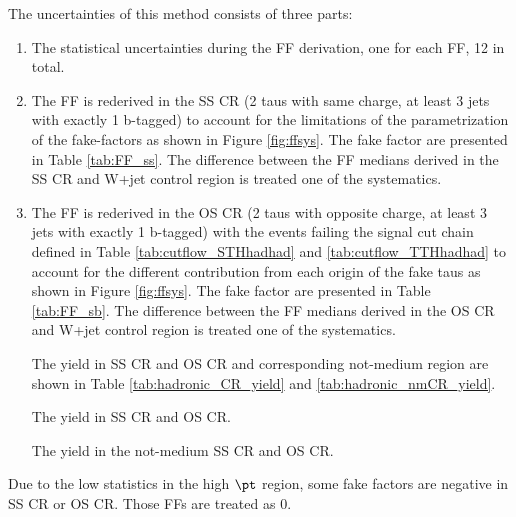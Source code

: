 The uncertainties of this method consists of three parts:
\begin{enumerate}

\item The statistical uncertainties during the FF derivation, one for each FF, 12 in total.

\item The FF is rederived in the SS CR (2 taus with same charge, at least 3 jets with exactly 1 b-tagged) to account for the limitations of the parametrization of the fake-factors as shown in Figure \ref{fig:ffsys}. The fake factor are presented in Table \ref{tab:FF_ss}. The difference between the FF medians derived in the SS CR and W+jet control region is treated one of the systematics.

\item The FF is rederived in the OS CR (2 taus with opposite charge, at least 3 jets with exactly 1 b-tagged) with the events failing the signal cut chain defined in Table \ref{tab:cutflow_STHhadhad} and \ref{tab:cutflow_TTHhadhad} to account for the different contribution from each origin of the fake taus as shown in Figure \ref{fig:ffsys}. The fake factor are presented in Table \ref{tab:FF_sb}. The difference between the FF medians derived in the OS CR and W+jet control region is treated one of the systematics.

The yield in SS CR and OS CR and corresponding not-medium region are shown in Table \ref{tab:hadronic_CR_yield} and \ref{tab:hadronic_nmCR_yield}.

\begin{table}
\caption{The yield in SS CR and OS CR.}
\label{tab:hadronic_CR_yield}


\end{table}

\begin{table}
\caption{The yield in the not-medium SS CR and OS CR.}
\label{tab:hadronic_nmCR_yield}


\end{table}

\end{enumerate}



Due to the low statistics in the high $\pt$ region, some fake factors are negative in SS CR or OS CR. Those FFs are treated as 0.

